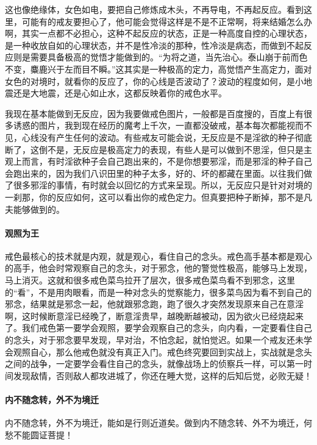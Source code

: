\documentclass{ctexart}
\begin{document}
这也像绝缘体，女色如电，要把自己修炼成木头，不再导电，不再起反应。看到这里，可能有的戒友要担心了，他可能会觉得这样是不是不正常啊，将来结婚怎么办啊，其实一点都不必担心，这种不起反应的状态，正是一种高度自控的心理状态，是一种收放自如的心理状态，并不是性冷淡的那种，性冷淡是病态，而做到不起反应则是需要具备极高的觉悟才能做到的。“为将之道，当先治心。泰山崩于前而色不变，麋鹿兴于左而目不瞬。”这其实是一种极高的定力，高觉悟产生高定力，面对女色的对境时，就看你的反应了，你的心线是否波动了？波动的程度如何，是小地震还是大地震，还是心如止水，这都反映着你的戒色水平。

我现在基本能做到无反应，因为我要做戒色图片，一般都是百度搜的，百度上有很多诱惑的图片，我到现在经历的魔考上千次，一直都没破戒，基本每次都能视而不见，心线没有产生任何的波动。有些戒友可能会说，无反应是不是淫欲的种子彻底断了，这倒不是，无反应是极高定力的表现，有些人是可以做到不思淫，但只是主观上而言，有时淫欲种子会自己跑出来的，不是你想要邪淫，而是邪淫的种子自己会跑出来的，因为我们八识田里的种子太多，好的、坏的都藏在里面。以往我们做了很多邪淫的事情，有时就会以回忆的方式来呈现。所以，无反应只是针对对境的一刹那，你的反应如何，这可以看出你的戒色定力。但真要把种子断掉，那不是凡夫能够做到的。

\paragraph{观照为王}

戒色最核心的技术就是内观，就是观心，看住自己的念头。戒色高手基本都是观心的高手，他会时常观察自己的念头，对于邪念，他的警觉性极高，能够马上发现，马上消灭。这就和很多戒色菜鸟拉开了层次，很多戒色菜鸟看不到邪念，这里的“看”，不是用肉眼看，而是一种对念头的觉察能力，很多菜鸟因为看不到自己的邪念，结果就是邪念一起，他就跟邪念跑，跑了很久才突然发现原来自己在意淫啊，这时候断意淫已经晚了，断意淫贵早，越晚断越被动，因为欲火已经烧起来了。我们戒色第一要学会观照，要学会观察自己的念头，向内看，一定要看住自己的念头，对于邪念要早发现，早对治，不怕念起，就怕觉迟。如果一个戒友还未学会观照自心，那么他戒色就没有真正入门。戒色终究要回到实战上，实战就是念头之间的战争，一定要学会看住自己的念头，就像战场上的侦察兵一样，可以第一时间发现敌情，否则敌人都攻进城了，你还在睡大觉，这样的后知后觉，必败无疑！

\paragraph{内不随念转，外不为境迁}

内不随念转，外不为境迁，能如是行则近道矣。做到内不随念转、外不为境迁，何愁不能圆证菩提！
\end{document}
